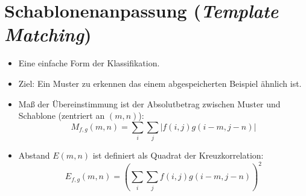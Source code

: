 \section{Schablonenanpassung (\textsl{Template Matching})}
\begin{itemize}
\item Eine einfache Form der Klassifikation.
\item Ziel: Ein Muster zu erkennen das einem abgespeicherten Beispiel ähnlich ist.
\item Maß der Übereinstimmung ist der Absolutbetrag zwischen Muster und Schablone (zentriert an $(m,n)$): $$M_{f,g}(m,n) = \sum\limits_i \sum\limits_j | f(i,j) g(i-m,j-n)|$$
\item Abstand $E(m,n)$ ist definiert als Quadrat der Kreuzkorrelation: $$E_{f,g} (m,n) = \left( \sum\limits_i \sum\limits_j f(i,j) g(i-m,j-n) \right)^2$$
\end{itemize}
